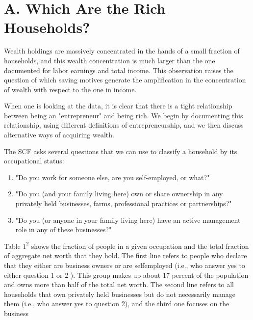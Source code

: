 \documentclass[10pt]{article}
\begin{document}
\section*{A. Which Are the Rich Households?}
Wealth holdings are massively concentrated in the hands of a small fraction of households, and this wealth concentration is much larger than the one documented for labor earnings and total income. This observation raises the question of which saving motives generate the amplification in the concentration of wealth with respect to the one in income.

When one is looking at the data, it is clear that there is a tight relationship between being an "entrepreneur" and being rich. We begin by documenting this relationship, using different definitions of entrepreneurship, and we then discuss alternative ways of acquiring wealth.

The SCF asks several questions that we can use to classify a household by its occupational status:

\begin{enumerate}
  \item "Do you work for someone else, are you self-employed, or what?"
  \item "Do you (and your family living here) own or share ownership in any privately held businesses, farms, professional practices or partnerships?"
  \item "Do you (or anyone in your family living here) have an active management role in any of these businesses?"
\end{enumerate}

Table $1^{2}$ shows the fraction of people in a given occupation and the total fraction of aggregate net worth that they hold. The first line refers to people who declare that they either are business owners or are selfemployed (i.e., who answer yes to either question 1 or 2 ). This group makes up about 17 percent of the population and owns more than half of the total net worth. The second line refers to all households that own privately held businesses but do not necessarily manage them (i.e., who answer yes to question 2), and the third one focuses on the business
\end{document}
